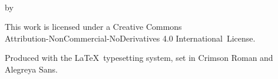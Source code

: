 \cleartoverso
\thispagestyle{empty}

{\copyrightsize
\centering
\setlength{\parindent}{0pt}%
\setlength{\parskip}{0.8\baselineskip}%

\thetitle\\
by \theauthor

% 
% 
% 

\vfill

This work is licensed under a Creative Commons\\
Attribution-NonCommercial-NoDerivatives 4.0 International~License.

Produced with the \LaTeX\ typesetting system, set in Crimson Roman and Alegreya Sans.


}
